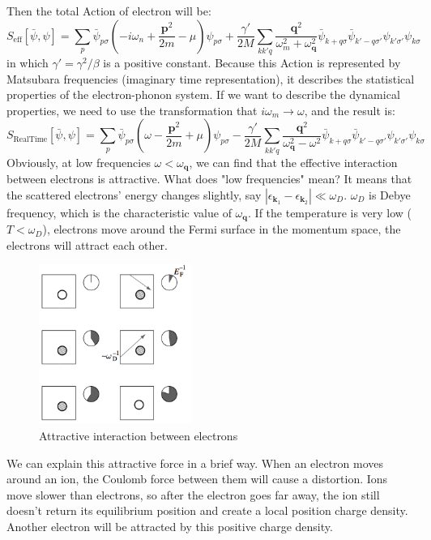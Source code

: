 \documentclass{article}
\newcommand{\mtp}{\mathbf{p}}
\newcommand{\mtq}{\mathbf{q}}
\newcommand{\mtk}{\mathbf{k}}
\begin{document}
Then the total Action of electron will be:
\begin{equation}
S_{\mathrm{eff}}[\bar{\psi},\psi] = \sum_{p}\bar{\psi}_{p\sigma}\left(-i\omega_n +\frac{\mtp^2}{2m}-\mu\right)\psi_{p\sigma} + \frac{\gamma'}{2M}\sum_{kk'q} \frac{\mtq^2}{\omega_m^2 + \omega_\mtq^2} \bar{\psi}_{k+q\sigma}\bar{\psi}_{k'-q\sigma'}\psi_{k'\sigma'}\psi_{k\sigma}
\end{equation}
in which $\gamma' = \gamma^2/\beta$ is a positive constant.
Because this Action is represented by Matsubara frequencies (imaginary time representation), it describes the statistical properties of the electron-phonon system. If we want to describe the dynamical properties, we need to use the transformation that $i\omega_m \rightarrow \omega$, and the result is:
\begin{equation}
S_{\mathrm{Real Time}}[\bar{\psi},\psi] = \sum_{p}\bar{\psi}_{p\sigma}\left(\omega-\frac{\mtp^2}{2m}+\mu\right)\psi_{p\sigma} - \frac{\gamma'}{2M}\sum_{kk'q}\frac{\mtq^2}{\omega_\mtq^2-\omega^2} \bar{\psi}_{k+q\sigma}\bar{\psi}_{k'-q\sigma'}\psi_{k'\sigma'}\psi_{k\sigma}
\end{equation}
Obviously, at low frequencies $\omega < \omega_\mtq$, we can find that the effective interaction between electrons is attractive. What does "low frequencies" mean? It means that the scattered electrons' energy changes slightly, say $|\epsilon_{\mtk_1}-\epsilon_{\mtk_2}|\ll \omega_D$. $\omega_D$ is Debye frequency, which is the characteristic value of $\omega_\mtq$. If the temperature is very low ($T < \omega_D$), electrons move around the Fermi surface in the momentum space, the electrons will attract each other. 

\begin{figure}[!htp]
\centering
\includegraphics[width=5cm]{./figures/pic1.png}
\caption{Attractive interaction between electrons}
\end{figure}

We can explain this attractive force in a brief way. When an electron moves around an ion, the Coulomb force between them will cause a distortion. Ions move slower than electrons, so after the electron goes far away, the ion still doesn't return its equilibrium position and create a local position charge density. Another electron will be attracted by this positive charge density.
\end{document}
